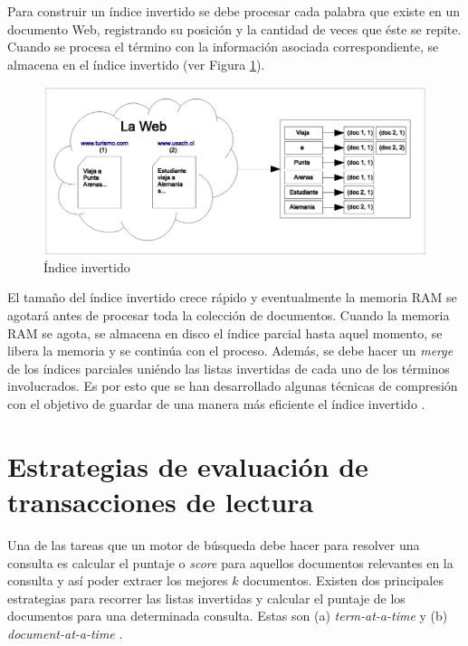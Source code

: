 Para construir un índice invertido \citep{Baeza-Yates:2011, Salton:2003} se debe procesar cada palabra que existe en un documento Web, registrando su posición y la cantidad de veces que éste se repite. Cuando se procesa el término con la información asociada correspondiente, se almacena en el índice invertido (ver Figura \ref{fig:invertedindex}).

\begin{figure}[!th]
\centering
\includegraphics[scale=.75]{images/invertedindex.eps}
\caption{\'Indice invertido}
\label{fig:invertedindex}
\end{figure}

El tamaño del índice invertido crece rápido y eventualmente la memoria RAM se agotará antes de procesar toda la colección de documentos. Cuando la memoria RAM se agota, se almacena en disco el índice parcial hasta aquel momento, se libera la memoria y se continúa con el proceso. Además, se debe hacer un \textit{merge} de los índices parciales uniéndo las listas invertidas de cada uno de los términos involucrados. Es por esto que se han desarrollado algunas técnicas de compresión con el objetivo de guardar de una manera más eficiente el índice invertido \citep{Arroyuelo:2013, Baeza-Yates:2011, Yan:2009}.

\section{Estrategias de evaluaci\'on de transacciones de lectura}
\label{marco:eeq}
Una de las tareas que un motor de búsqueda debe hacer para resolver una consulta es calcular el puntaje o \textit{score} para aquellos documentos relevantes en la consulta y así poder extraer los mejores $k$ documentos. Existen dos principales estrategias para recorrer las listas invertidas y calcular el puntaje de los documentos para una determinada consulta. Estas son (a) \textit{term-at-a-time} \citep{Buckley:1985, Turtle:1995} y (b) \textit{document-at-a-time} \citep{Broder:2003, Turtle:1995}.

